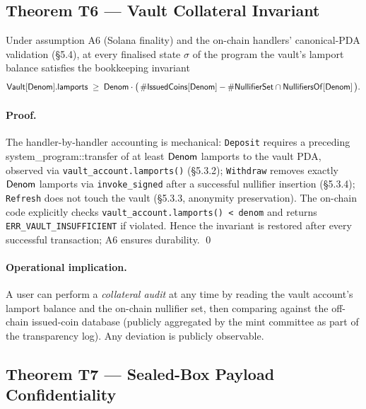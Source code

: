\subsection{Theorem T6 --- Vault Collateral Invariant}
\label{sec:thm-collateral}

\begin{theorem}
\label{thm:collateral}
Under assumption A6 (Solana finality) and the on-chain handlers'
canonical-PDA validation (\S5.4), at every
finalised state $\sigma$ of the program the vault's lamport balance
satisfies the bookkeeping invariant
\[
  \mathsf{Vault}[\mathsf{Denom}].\mathsf{lamports} \;\geq\;
  \mathsf{Denom} \cdot \bigl(\,
    \#\mathsf{IssuedCoins}[\mathsf{Denom}] - \#\mathsf{NullifierSet} \cap
        \mathsf{NullifiersOf}[\mathsf{Denom}]
  \,\bigr).
\]
\end{theorem}

\paragraph{Proof.} The handler-by-handler accounting is mechanical:
\texttt{Deposit} requires a preceding system\_program::transfer of at least
$\mathsf{Denom}$ lamports to the vault PDA, observed via
\texttt{vault\_account.lamports()} (\S5.3.2);
\texttt{Withdraw} removes exactly $\mathsf{Denom}$ lamports via
\texttt{invoke\_signed} after a successful nullifier insertion
(\S5.3.4); \texttt{Refresh} does not touch the vault
(\S5.3.3, anonymity preservation). The on-chain code
explicitly checks
\texttt{vault\_account.lamports() < denom} and returns
\texttt{ERR\_VAULT\_INSUFFICIENT} if violated. Hence the invariant is
restored after every successful transaction; A6 ensures durability. \qed

\paragraph{Operational implication.} A user can perform a
\emph{collateral audit} at any time by reading the vault account's
lamport balance and the on-chain nullifier set, then comparing against
the off-chain issued-coin database (publicly aggregated by the mint
committee as part of the transparency log). Any deviation is publicly
observable.

\subsection{Theorem T7 --- Sealed-Box Payload Confidentiality}
\label{sec:theorem-T7}

